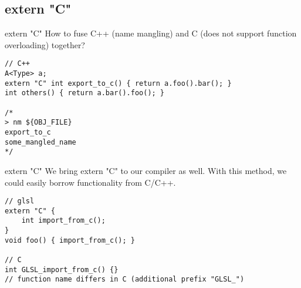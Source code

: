 \subsection{extern "C"}

\begin{frame}[fragile]{extern "C"}
    How to fuse C++ (name mangling) and C 
    (does not support function overloading) together?

    \begin{lstlisting}
// C++ 
A<Type> a;
extern "C" int export_to_c() { return a.foo().bar(); }
int others() { return a.bar().foo(); }

/*
> nm ${OBJ_FILE}
export_to_c
some_mangled_name
*/
    \end{lstlisting}
\end{frame}

\begin{frame}[fragile]{extern "C"}
    We bring extern "C" to our compiler as well. With this method,
    we could easily borrow functionality from C/C++.
    \begin{lstlisting}
// glsl 
extern "C" {
    int import_from_c();
}
void foo() { import_from_c(); }

// C
int GLSL_import_from_c() {}
// function name differs in C (additional prefix "GLSL_")
    \end{lstlisting}
\end{frame}